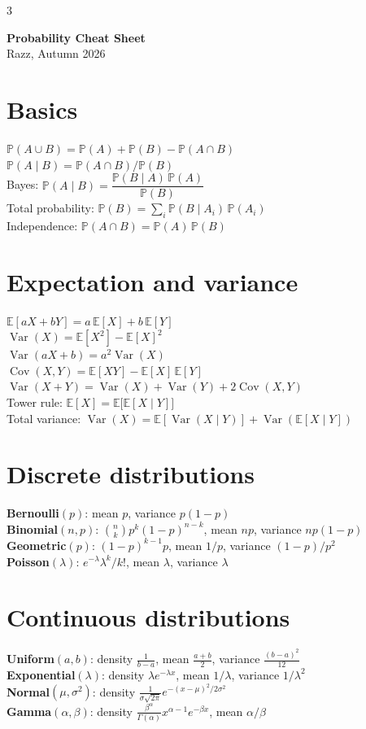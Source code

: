 \documentclass[9pt,landscape,a4paper]{extarticle}
\newcommand{\E}{\mathbb{E}}
\newcommand{\Var}{\operatorname{Var}}
\newcommand{\Cov}{\operatorname{Cov}}
\renewcommand{\P}{\mathbb{P}}
\begin{document}
\begin{multicols*}{3}

\begin{center}
  {\large \textbf{Probability Cheat Sheet}} \\ Razz, Autumn 2026
\end{center}

\section{Basics}
$\P(A \cup B) = \P(A) + \P(B) - \P(A \cap B)$ \\
$\P(A \mid B) = \P(A \cap B) / \P(B)$ \\
Bayes: $\P(A \mid B) = \dfrac{\P(B \mid A)\,\P(A)}{\P(B)}$ \\
Total probability: $\P(B) = \sum_i \P(B \mid A_i)\,\P(A_i)$ \\
Independence: $\P(A \cap B) = \P(A)\,\P(B)$

\section{Expectation and variance}
$\E[aX + bY] = a\,\E[X] + b\,\E[Y]$ \\
$\Var(X) = \E[X^2] - \E[X]^2$ \\
$\Var(aX + b) = a^2 \Var(X)$ \\
$\Cov(X, Y) = \E[XY] - \E[X]\,\E[Y]$ \\
$\Var(X + Y) = \Var(X) + \Var(Y) + 2\Cov(X, Y)$ \\
Tower rule: $\E[X] = \E\bigl[\E[X \mid Y]\bigr]$ \\
Total variance: $\Var(X) = \E[\Var(X \mid Y)] + \Var(\E[X \mid Y])$

\section{Discrete distributions}
\textbf{Bernoulli}$(p)$: mean $p$, variance $p(1-p)$ \\
\textbf{Binomial}$(n, p)$: $\binom{n}{k} p^k (1-p)^{n-k}$, mean $np$, variance $np(1-p)$ \\
\textbf{Geometric}$(p)$: $(1-p)^{k-1} p$, mean $1/p$, variance $(1-p)/p^2$ \\
\textbf{Poisson}$(\lambda)$: $e^{-\lambda} \lambda^k / k!$, mean $\lambda$, variance $\lambda$

\section{Continuous distributions}
\textbf{Uniform}$(a, b)$: density $\frac{1}{b-a}$, mean $\frac{a+b}{2}$, variance $\frac{(b-a)^2}{12}$ \\
\textbf{Exponential}$(\lambda)$: density $\lambda e^{-\lambda x}$, mean $1/\lambda$, variance $1/\lambda^2$ \\
\textbf{Normal}$(\mu, \sigma^2)$: density $\frac{1}{\sigma\sqrt{2\pi}} e^{-(x-\mu)^2 / 2\sigma^2}$ \\
\textbf{Gamma}$(\alpha, \beta)$: density $\frac{\beta^\alpha}{\Gamma(\alpha)} x^{\alpha-1} e^{-\beta x}$, mean $\alpha/\beta$


\end{multicols*}
\end{document}
